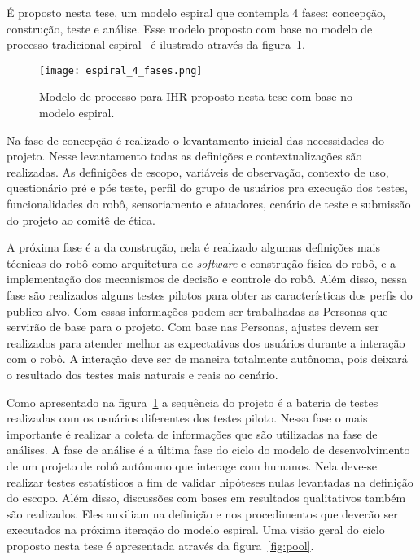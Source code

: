 É proposto nesta tese, um modelo espiral que contempla 4 fases: concepção, construção, teste e análise. Esse modelo proposto com base no modelo de processo tradicional espiral~\cite{sommerville:2008} é ilustrado através da figura~\ref{fig:espiral}.

\begin{figure}[ht!]
	\centering
	\begin{minipage}{0.7\textwidth}
		\caption{Modelo de processo para IHR proposto nesta tese com base no modelo espiral.}
		\texttt{[image: espiral\_4\_fases.png]}
		\label{fig:espiral}
	\end{minipage}
\end{figure}

Na fase de concepção é realizado o levantamento inicial das necessidades do projeto. Nesse levantamento todas as definições e contextualizações são realizadas. As definições de escopo, variáveis de observação, contexto de uso, questionário pré e pós teste, perfil do grupo de usuários pra execução dos testes, funcionalidades do robô, sensoriamento e atuadores, cenário de teste e submissão do projeto ao comitê de ética. 

A próxima fase é a da construção, nela é realizado algumas definições mais técnicas do robô como arquitetura de \textit{software} e construção física do robô, e a implementação dos mecanismos de decisão e controle do robô. Além disso, nessa fase são realizados alguns testes pilotos para obter as características dos perfis do publico alvo. Com essas informações podem ser trabalhadas as Personas que servirão de base para o projeto. Com base nas Personas, ajustes devem ser realizados para atender melhor as expectativas dos usuários durante a interação com o robô. A interação deve ser de maneira totalmente autônoma, pois deixará o resultado dos testes mais naturais e reais ao cenário.

Como apresentado na figura~\ref{fig:espiral} a sequência do projeto é a bateria de testes realizadas com os usuários diferentes dos testes piloto. Nessa fase o mais importante é realizar a coleta de informações que são utilizadas na fase de análises. A fase de análise é a última fase do ciclo do modelo de desenvolvimento de um projeto de robô autônomo que interage com humanos. Nela deve-se realizar testes estatísticos a fim de validar hipóteses nulas levantadas na definição do escopo. Além disso, discussões com bases em resultados qualitativos também são realizados. Eles auxiliam na definição e nos procedimentos que deverão ser executados na próxima iteração do modelo espiral. Uma visão geral do ciclo proposto nesta tese é apresentada através da figura~\ref{fig:pool}.


